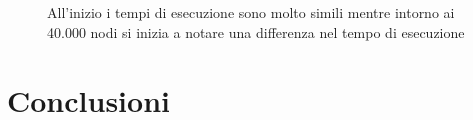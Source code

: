 \documentclass[]{article}
\begin{document}
\begin{flushleft}
\begin{figure}[h]
All'inizio i tempi di esecuzione sono molto simili mentre intorno ai 40.000 nodi si inizia a notare una differenza nel tempo di esecuzione
\end{figure}

\end{flushleft}
\newpage
\section{Conclusioni}
\end{document}
